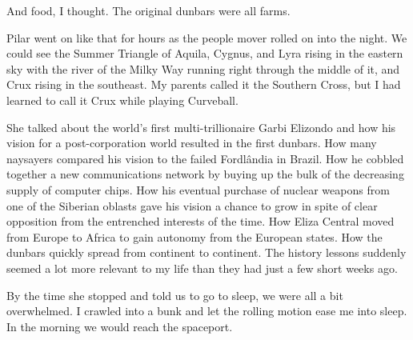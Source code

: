 And food, I thought. The original dunbars were all farms.

Pilar went on like that for hours as the people mover rolled on into the night. We could see the Summer Triangle of Aquila, Cygnus, and Lyra rising in the eastern sky with the river of the Milky Way running right through the middle of it, and Crux rising in the southeast. My parents called it the Southern Cross, but I had learned to call it Crux while playing Curveball.

She talked about the world's first multi-trillionaire Garbi Elizondo and how his vision for a post-corporation world resulted in the first dunbars. How many naysayers compared his vision to the failed Fordl\^{a}ndia in Brazil. How he cobbled together a new communications network by buying up the bulk of the decreasing supply of computer chips. How his eventual purchase of nuclear weapons from one of the Siberian oblasts gave his vision a chance to grow in spite of clear opposition from the entrenched interests of the time. How Eliza Central moved from Europe to Africa to gain autonomy from the European states. How the dunbars quickly spread from continent to continent. The history lessons suddenly seemed a lot more relevant to my life than they had just a few short weeks ago.

By the time she stopped and told us to go to sleep, we were all a bit overwhelmed. I crawled into a bunk and let the rolling motion ease me into sleep. In the morning we would reach the spaceport.

\newpage
\thispagestyle{empty}
